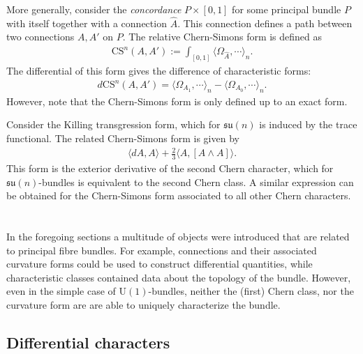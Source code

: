     More generally, consider the \textit{concordance} $P\times[0,1]$ for some principal bundle $P$ with itself together with a connection $\hat{A}$. This connection defines a path between two connections $A,A'$ on $P$. The relative Chern-Simons form is defined as
    \begin{gather}
        \mathrm{CS}^n(A,A') := \int_{[0,1]}\langle\Omega_{\hat{A}},\cdots\rangle_n.
    \end{gather}
    The differential of this form gives the difference of characteristic forms:
    \begin{gather}
        d\mathrm{CS}^n(A,A') = \langle\Omega_{A_1},\cdots\rangle_n - \langle\Omega_{A_0},\cdots\rangle_n.
    \end{gather}
    However, note that the Chern-Simons form is only defined up to an exact form.

    \begin{example}
        Consider the Killing transgression form, which for $\mathfrak{su}(n)$ is induced by the trace functional. The related Chern-Simons form is given by
        \begin{gather}
            \langle dA,A \rangle + \frac{2}{3}\langle A,[A\wedge A] \rangle.
        \end{gather}
        This form is the exterior derivative of the second Chern character, which for $\mathfrak{su}(n)$-bundles is equivalent to the second Chern class. A similar expression can be obtained for the Chern-Simons form associated to all other Chern characters.
    \end{example}

\section{}\label{section:differential_cohomology}

    In the foregoing sections a multitude of objects were introduced that are related to principal fibre bundles. For example, connections and their associated curvature forms could be used to construct differential quantities, while characteristic classes contained data about the topology of the bundle. However, even in the simple case of $\mathrm{U}(1)$-bundles, neither the (first) Chern class, nor the curvature form are are able to uniquely characterize the bundle.

\subsection{Differential characters}

